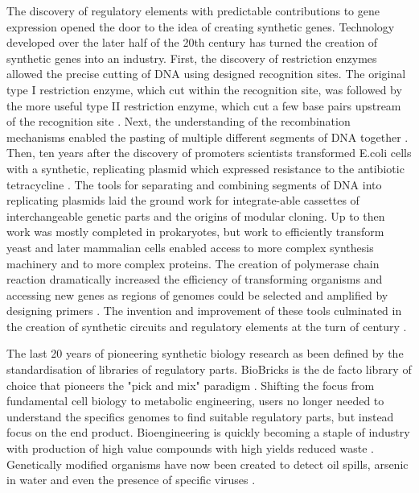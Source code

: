 \documentclass[../main.tex]{subfiles}
\begin{document}
The discovery of regulatory elements with predictable contributions to gene expression opened the door to the idea of creating synthetic genes.
Technology developed over the later half of the 20th century has turned the creation of synthetic genes into an industry.
First, the discovery of restriction enzymes allowed the precise cutting of DNA using designed recognition sites. 
The original type I restriction enzyme, which cut within the recognition site, \parencite{Arber2003,Meselson1968} was followed by the more useful type II restriction enzyme, which cut a few base pairs upstream of the recognition site \parencite{Smith1970,Kelly1970}. 
Next, the understanding of the recombination mechanisms enabled the pasting of multiple different segments of DNA together \parencite{Jackson1972,Cohen1973}. 
Then, ten years after the discovery of promoters scientists transformed E.coli cells with a synthetic, replicating plasmid which expressed resistance to the antibiotic tetracycline \parencite{Cohen1973}. 
The tools for separating and combining segments of DNA into replicating plasmids laid the ground work for integrate-able cassettes of interchangeable genetic parts and the origins of modular cloning.
Up to then work was mostly completed in prokaryotes, but work to efficiently transform yeast \parencite{Beggs1978} and later mammalian cells \parencite{Capecchi1989} enabled access to more complex synthesis machinery and to more complex proteins. 
The creation of polymerase chain reaction dramatically increased the efficiency of transforming organisms and accessing new genes as regions of genomes could be selected and amplified by designing primers \parencite{Saiki1988}. 
The invention and improvement of these tools culminated in the creation of synthetic circuits and regulatory elements at the turn of century \parencite{Elowitz2000,Gardner2000}.

The last 20 years of pioneering synthetic biology research as been defined by the standardisation of libraries of regulatory parts. 
BioBricks is the de facto library of choice that pioneers the "pick and mix" paradigm \parencite{Knight2003}.
Shifting the focus from fundamental cell biology to metabolic engineering, users no longer needed to understand the specifics genomes to find suitable regulatory parts, but instead focus on the end product. 
Bioengineering is quickly becoming a staple of industry with production of high value compounds with high yields reduced waste \parencite{Krivoruchko2015}.
Genetically modified organisms have now been created to detect oil spills, arsenic in water and even the presence of specific viruses \parencite{Wan2019,Willardson1998,Tancharoen2019}.
\end{document}
